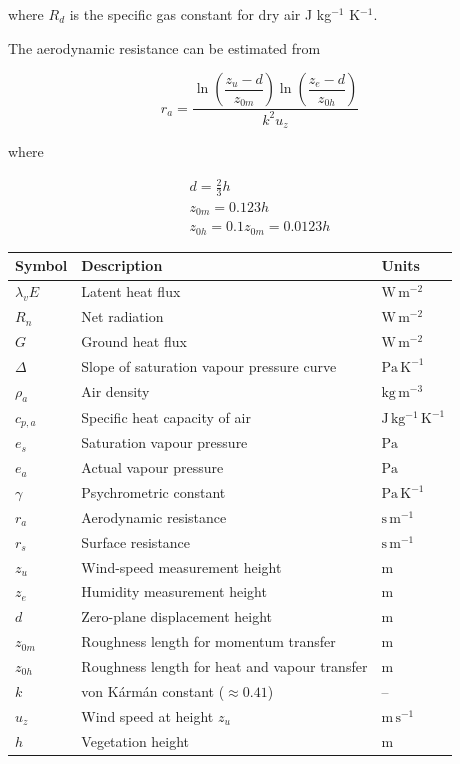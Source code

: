 \documentclass[10pt,a4paper]{article}
\begin{document}
where $R_d$ is the specific gas constant for dry air J kg$^{-1}$ K$^{-1}$. 

The aerodynamic resistance can be estimated from

\begin{equation}
r_a =
\frac{
    \ln\left(\dfrac{z_u-d}{z_{0m}}\right)
    \ln\left(\dfrac{z_e-d}{z_{0h}}\right)
}{
    k^2 u_z
}
\end{equation}

where

\begin{equation}
	\begin{array}{c}
d = \frac{2}{3}h\\
z_{0m} = 0.123h\\
z_{0h} = 0.1z_{0m} = 0.0123h
	\end{array}
\end{equation}

\begin{table}[h] \label{tab: PMCE}
\centering
\begin{tabular}{lll}
\hline
Symbol & Description & Units \\
\hline
$\lambda_v E$ & Latent heat flux & $\mathrm{W\,m^{-2}}$ \\
$R_n$ & Net radiation & $\mathrm{W\,m^{-2}}$ \\
$G$ & Ground heat flux & $\mathrm{W\,m^{-2}}$ \\
$\Delta$ & Slope of saturation vapour pressure curve & $\mathrm{Pa\,K^{-1}}$ \\
$\rho_a$ & Air density & $\mathrm{kg\,m^{-3}}$ \\
$c_{p,a}$ & Specific heat capacity of air & $\mathrm{J\,kg^{-1}\,K^{-1}}$ \\
$e_s$ & Saturation vapour pressure & $\mathrm{Pa}$ \\
$e_a$ & Actual vapour pressure & $\mathrm{Pa}$ \\
$\gamma$ & Psychrometric constant & $\mathrm{Pa\,K^{-1}}$ \\
$r_a$ & Aerodynamic resistance & $\mathrm{s\,m^{-1}}$ \\
$r_s$ & Surface resistance & $\mathrm{s\,m^{-1}}$ \\
$z_u$ & Wind-speed measurement height & $\mathrm{m}$ \\
$z_e$ & Humidity measurement height & $\mathrm{m}$ \\
$d$ & Zero-plane displacement height & $\mathrm{m}$ \\
$z_{0m}$ & Roughness length for momentum transfer & $\mathrm{m}$ \\
$z_{0h}$ & Roughness length for heat and vapour transfer & $\mathrm{m}$ \\
$k$ & von K\'arm\'an constant ($\approx 0.41$) & -- \\
$u_z$ & Wind speed at height $z_u$ & $\mathrm{m\,s^{-1}}$ \\
$h$ & Vegetation height & $\mathrm{m}$ \\
\hline
\end{tabular}
\end{table}
\end{document}

